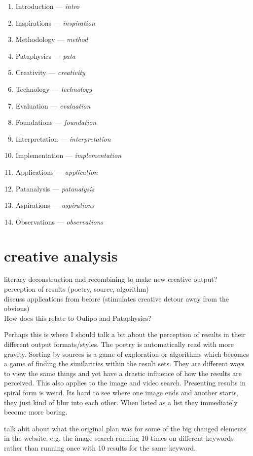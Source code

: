 \begin{enumerate}
  \item Introduction --- \emph{intro}
  \item Inspirations --- \emph{inspiration}
  \item Methodology --- \emph{method}
  \item Pataphysics --- \emph{pata}
  \item Creativity --- \emph{creativity}
  \item Technology --- \emph{technology}
  \item Evaluation --- \emph{evaluation}
  \item Foundations --- \emph{foundation}
  \item Interpretation --- \emph{interpretation}
  \item Implementation --- \emph{implementation}
  \item Applications --- \emph{application}
  \item Patanalysis --- \emph{patanalysis}
  \item Aspirations --- \emph{aspirations}
  \item Observations --- \emph{observations}
\end{enumerate}






\section*{creative analysis}
\begin{draft}
  literary deconstruction and recombining to make new creative output? \\
  perception of results (poetry, source, algorithm) \\
  discuss applications from before (stimulates creative detour away from the obvious) \\

  How does this relate to Oulipo and Pataphysics? 

  Perhaps this is where I should talk a bit about the perception of results in their different output formats/styles. The poetry is automatically read with more gravity. Sorting by sources is a game of exploration or algorithms which becomes a game of finding the similarities within the result sets. They are different ways to view the same things and yet have a drastic influence of how the results are perceived. This also applies to the image and video search. Presenting results in spiral form is weird. Its hard to see where one image ends and another starts, they just kind of blur into each other. When listed as a list they immediately become more boring.

  talk abit about what the original plan was for some of the big changed elements in the website, e.g. the image search running 10 times on different keywords rather than running once with 10 results for the same keyword.
\end{draft}


